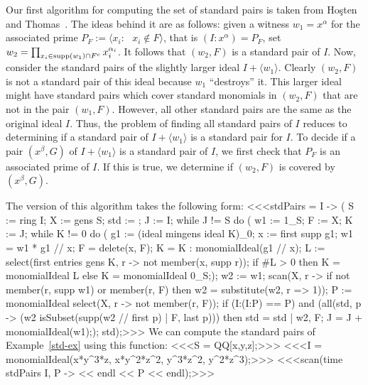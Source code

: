 Our first algorithm for computing the set of standard
pairs is taken from Ho\c{s}ten and
Thomas~\cite{MR2000f:13052}.  The ideas behind it are as follows:
given a witness $w_1 = x^{\alpha}$ for the associated prime $P_F :=
\langle x_{i} : \text{ $x_{i} \notin F$} \rangle$, that is $(I :
x^{\alpha}) = P_F$, set $w_2 = \prod_{x_i \in \operatorname{supp}(w_1) \cap F^c}
x_i^{\alpha_{i}}$.  It follows that $(w_2, F)$ is a standard pair of
$I$.  Now, consider the standard pairs of the slightly larger ideal $I
+ \langle w_1 \rangle$.  Clearly $(w_2, F)$ is not a standard pair of
this ideal because $w_1$ ``destroys'' it.  This larger ideal might
have standard pairs which cover standard monomials in $(w_2, F)$ that
are not in the pair $(w_1, F)$.  However, all other standard pairs are
the same as the original ideal $I$.  Thus, the problem of finding all
standard pairs of $I$ reduces to determining if a standard pair of $I
+ \langle w_1 \rangle$ is a standard pair for $I$.  To decide if a
pair $(x^{\beta}, G)$ of $I + \langle w_1 \rangle$ is a standard pair
of $I$, we first check that $P_{F}$ is an associated prime of $I$.  If
this is true, we determine if $(w_{2},F)$ is covered by
$(x^{\beta},G)$.

The \Mtwo version of this algorithm takes the following form:
<<<stdPairs = I -> (
     S := ring I;
     X := gens S;
     std := {};
     J := I;
     while J != S do (
          w1 := 1_S;
          F := X;
          K := J;
          while K != 0 do (
               g1 := (ideal mingens ideal K)_0;
               x := first supp g1;
               w1 = w1 * g1 // x;
               F = delete(x, F);
               K = K : monomialIdeal(g1 // x);
               L := select(first entries gens K, 
                    r -> not member(x, supp r));
               if #L > 0 then K = monomialIdeal L
               else K = monomialIdeal 0_S;);
          w2 := w1;
          scan(X, r -> if not member(r, supp w1) or member(r, F)
               then w2 = substitute(w2, {r => 1}));
          P := monomialIdeal select(X, r -> not member(r, F));
          if (I:(I:P) == P) and (all(std, p -> 
                    (w2 %
                    isSubset(supp(w2 // first p) | F, last p)))
          then std = std | {{w2, F}};
          J = J + monomialIdeal(w1););
     std);>>>
We can compute the standard pairs of Example~\ref{std-ex} using this
\Mtwo function:
<<<S = QQ[x,y,z];>>>
<<<I = monomialIdeal(x*y^3*z, x*y^2*z^2, y^3*z^2, y^2*z^3);>>>
<<<scan(time stdPairs I, P -> << endl << P << endl);>>>

